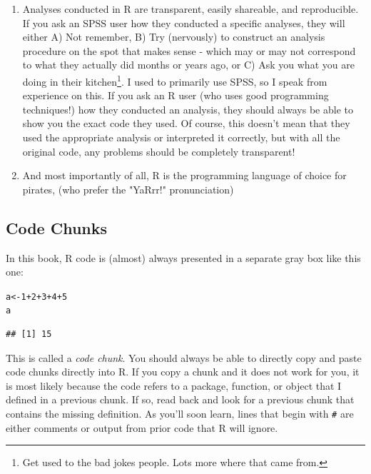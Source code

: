 \documentclass{tufte-book}\usepackage[]{graphicx}\usepackage[]{color}
\makeatletter
\newcommand{\hlnum}[1]{\textcolor[rgb]{0.686,0.059,0.569}{#1}}%
\newcommand{\hlopt}[1]{\textcolor[rgb]{0,0,0}{#1}}%
\newcommand{\hlstd}[1]{\textcolor[rgb]{0.345,0.345,0.345}{#1}}%
\newcommand{\hlkwb}[1]{\textcolor[rgb]{0.69,0.353,0.396}{#1}}%
\newenvironment{kframe}{%
 \def\at@end@of@kframe{}%
 \ifinner\ifhmode%
  \def\at@end@of@kframe{\end{minipage}}%
  \begin{minipage}{\columnwidth}%
 \fi\fi%
 \def\FrameCommand##1{\hskip\@totalleftmargin \hskip-\fboxsep
 \colorbox{shadecolor}{##1}\hskip-\fboxsep
     \hskip-\linewidth \hskip-\@totalleftmargin \hskip\columnwidth}%
 \MakeFramed {\advance\hsize-\width
   \@totalleftmargin\z@ \linewidth\hsize
   \@setminipage}}%
 {\par\unskip\endMakeFramed%
 \at@end@of@kframe}
\newenvironment{knitrout}{}{} %
\makeatother
\begin{document}
\begin{enumerate}
\item Analyses conducted in R are transparent, easily shareable, and reproducible. If you ask an SPSS user how they conducted a specific analyses, they will either A) Not remember,  B) Try (nervously) to construct an analysis procedure on the spot that makes sense - which may or may not correspond to what they actually did months or years ago, or C) Ask you what you are doing in their kitchen\footnote{Get used to the bad jokes people. Lots more where that came from.}. I used to primarily use SPSS, so I speak from experience on this. If you ask an R user (who uses good programming techniques!) how they conducted an analysis, they should always be able to show you the exact code they used. Of course, this doesn't mean that they used the appropriate analysis or interpreted it correctly, but with all the original code, any problems should be completely transparent!

\item And most importantly of all, R is the programming language of choice for pirates, (who prefer the "YaRrr!" pronunciation)

\end{enumerate}

\subsection{Code Chunks}

In this book, R code is (almost) always presented in a separate gray box like this one:

\begin{footnotesize}
\begin{knitrout}
\color{fgcolor}\begin{kframe}
\begin{alltt}
\hlstd{a} \hlkwb{<-} \hlnum{1} \hlopt{+} \hlnum{2} \hlopt{+} \hlnum{3} \hlopt{+} \hlnum{4} \hlopt{+} \hlnum{5}
\hlstd{a}
\end{alltt}
\begin{verbatim}
## [1] 15
\end{verbatim}
\end{kframe}
\end{knitrout}
\end{footnotesize}

This is called a \textit{code chunk}. You should always be able to directly copy and paste code chunks directly into R. If you copy a chunk and it does not work for you, it is most likely because the code refers to a package, function, or object that I defined in a previous chunk. If so, read back and look for a previous chunk that contains the missing definition. As you'll soon learn, lines that begin with \texttt{\#} are either comments or output from prior code that R will ignore.
\end{document}
